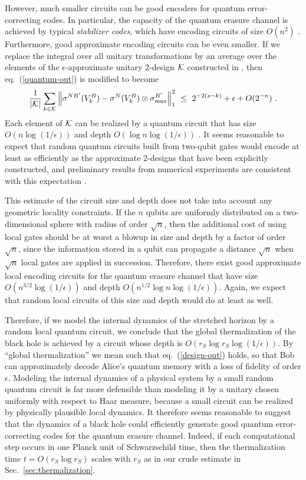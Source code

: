 \documentclass[12pt]{article}
\begin{document}
However, much smaller circuits can be good encoders for quantum error-correcting codes. In particular, the capacity of the quantum erasure channel is achieved by typical {\em stabilizer codes}, which have encoding circuits of size $O(n^2)$ \cite{gottesman-thesis}. Furthermore, good approximate encoding circuits can be even smaller. If we replace the integral over all unitary transformations by an average over the elements of the $\epsilon$-approximate unitary 2-design ${\cal K}$ constructed in \cite{cleve}, then eq.~(\ref{quantum-out}) is modified to become
\begin{eqnarray}
\label{design-out}
\frac{1}{|{\cal K}|}\sum_{k\in{\cal K}} \left\| \sigma^{NB'}(V_k^B)-\sigma^{N}(V_k^B)\otimes \sigma^{B'}_{\rm max}\right\|_1^2 ~\le ~ 2^{-2(s-k)} +\epsilon + O(2^{-n})~.
\end{eqnarray}
Each element of ${\cal K}$ can be realized by a quantum circuit that has size $O(n\log(1/\epsilon))$ and depth $O(\log n\log (1/\epsilon))$ \cite{cleve,dankert}. It seems reasonable to expect that random quantum circuits built from two-qubit gates would encode at least as efficiently as the approximate 2-designs that have been explicitly constructed, and preliminary results from numerical experiments are consistent with this expectation \cite{anderson-sim}. 

This estimate of the circuit size and depth does not take into account any geometric locality constraints.  If the $n$ qubits are uniformly distributed on a two-dimensional sphere with radius of order $\sqrt{n}$, then  the additional cost of using local gates should be at worst a blowup in size and depth by a factor of order $\sqrt{n}$, since the information stored in a qubit can propagate a distance $\sqrt{n}$ when $\sqrt{n}$ local gates are applied in succession. Therefore, there exist good approximate local encoding circuits for the quantum erasure channel that have size $O(n^{3/2}\log(1/\epsilon))$ and depth $O(n^{1/2}\log n\log(1/\epsilon))$. Again, we expect that random local circuits of this size and depth would do at least as well.

Therefore, if we model the internal dynamics of the stretched horizon by a random local quantum circuit, we conclude that the global thermalization of the black hole is achieved by a circuit whose depth is $O(r_S\log r_S \log(1/\epsilon))$. By ``global thermalization'' we mean such that eq.~(\ref{design-out}) holds, so that Bob can approximately decode Alice's quantum memory with a loss of fidelity of order $\epsilon$. Modeling the internal dynamics of a physical system by a small random quantum circuit is far more defensible than modeling it by a unitary chosen uniformly with respect to Haar measure, because a small circuit can  be realized by physically plausible local dynamics. It therefore seems reasonable to suggest that the dynamics of a black hole could efficiently generate good quantum error-correcting codes for the quantum erasure channel. Indeed, if each computational step occurs in one Planck unit of Schwarzschild time, then the thermalization time $t=O(r_S\log r_S)$ scales with $r_S$ as in our crude estimate in Sec.~\ref{sec:thermalization}.
\end{document}

